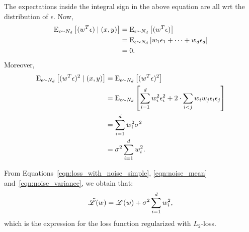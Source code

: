 The expectations inside the integral sign in the above equation are all wrt the 
distribution of $\epsilon$. Now, 
\begin{align}
    \label{eqn:noise_mean}
    \text{E}_{\epsilon \sim N_d} \left [ (w^T \epsilon) \mid (x, y) \right ] 
        & = \text{E}_{\epsilon \sim N_d} \left [ (w^T \epsilon) \right ] \nonumber \\
        & = \text{E}_{\epsilon \sim N_d} \left [ w_1 \epsilon_1 + \cdots + w_d \epsilon_d \right ] \nonumber \\
        & = 0.
\end{align}
Moreover, 
\begin{align}
    \label{eqn:noise_variance}
    \text{E}_{\epsilon \sim N_d} \left [ (w^T \epsilon)^2 \mid (x, y) \right ] 
        & = \text{E}_{\epsilon \sim N_d} \left [ (w^T \epsilon)^2 \right ] \nonumber \\
        & = \text{E}_{\epsilon \sim N_d} \left [ \sum_{i = 1}^{d} w_i^2 \epsilon_i^2 + 
                    2 \cdot \sum_{i < j} w_i w_j \epsilon_i \epsilon_j \right ] \nonumber \\
        & = \sum_{i = 1}^{d} w_i^2 \sigma^2 \nonumber \\
        & = \sigma^2 \sum_{i = 1}^{d} w_i^2.
\end{align}

From Equations~\ref{eqn:loss_with_noise_simple}, \ref{eqn:noise_mean} 
and~\ref{eqn:noise_variance}, we obtain that:
\begin{equation}
    \tilde{\mathscr{L}} (w) = \mathscr{L} (w) + \sigma^2 \sum_{i = 1}^{d} w_i^2,
\end{equation}
which is the expression for the loss function regularized with $L_2$-loss.
